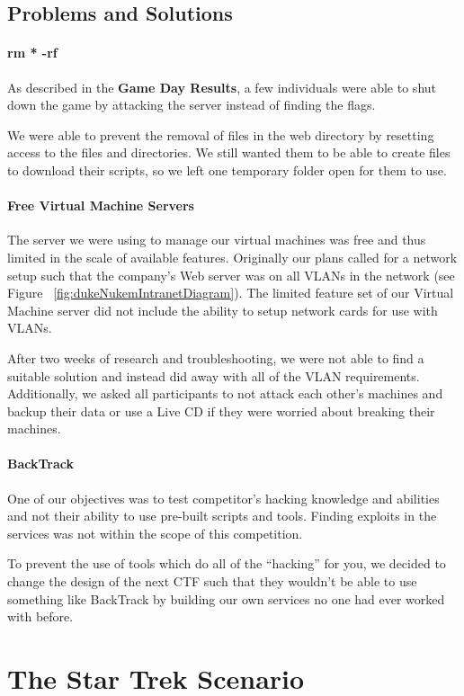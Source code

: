 \documentclass[10pt]{article}
\begin{document}
\subsection{Problems and Solutions}
\paragraph*{rm * -rf} As described in the \textbf{Game Day Results},
a few individuals were able to shut down the game by attacking the server
instead of finding the flags.

We were able to prevent the removal of files in the web directory by resetting
access to the files and directories. We still wanted them to be able to create
files to download their scripts, so we left one temporary folder open for them to
use. 

\paragraph*{Free Virtual Machine Servers} The server we were using to manage our
virtual machines was free and thus limited in the scale of available features.
Originally our plans called for a network setup such that the company's
Web server was on all VLANs in the network (see Figure
~\ref{fig:dukeNukemIntranetDiagram}). The limited feature set of our Virtual
Machine server did not include the ability to setup network cards for use with
VLANs. 

After two weeks of research and troubleshooting, we were not able to find a
suitable solution and instead did away with all of the VLAN requirements.
Additionally, we asked all participants to not attack each other's machines and
backup their data or use a Live CD if they were worried about breaking their
machines.

\paragraph*{BackTrack} One of our objectives was to test competitor's hacking
knowledge and abilities and not their ability to use pre-built scripts and
tools. Finding exploits in the services was not within the scope of this
competition. 

To prevent the use of tools which do all of the ``hacking'' for you, we decided
to change the design of the next CTF such that they wouldn't be able to use
something like BackTrack by building our own services no one had ever worked
with before. 

\section{The Star Trek Scenario}
\label{stscenario}
\end{document}
